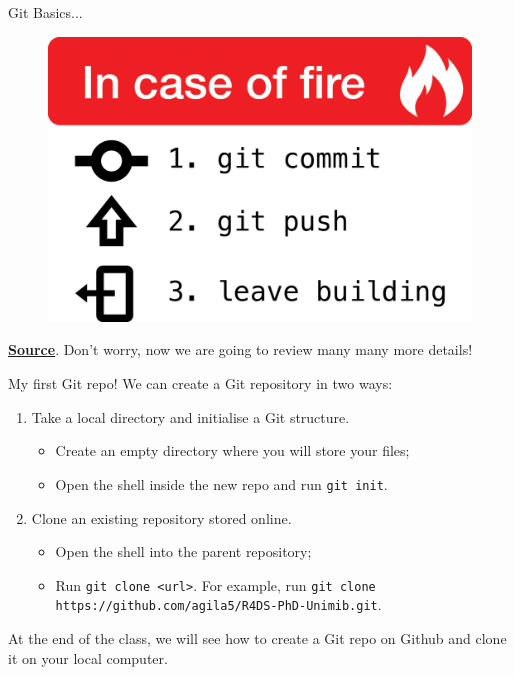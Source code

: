 \documentclass[
hyperref={bookmarks=false},
xcolor={dvipsnames,svgnames*,x11names*}, 
12pt
]{beamer}
\begin{document}
\begin{frame}{Git Basics...}
\vspace{-0.5cm}
\begin{figure}
\centering
\includegraphics[width=0.85\linewidth]{figures/incaseoffire.pdf}
\end{figure}
\href{https://hikaruzone.wordpress.com/2015/10/06/in-case-of-fire-1-git-commit-2-git-push-3-leave-building/}{\textbf{Source}}. Don't worry, now we are going to review many many more details! 
\end{frame}

\setlength{\leftmarginii}{0.25cm}

\begin{frame}{My first Git repo!}
\vspace{-0.5cm}
We can create a Git repository in two ways: 
\begin{enumerate}
\itemsep 2ex	
\item Take a local directory and initialise a Git structure.
\begin{itemize}
\item Create an empty directory where you will store your files;  
\item Open the shell inside the new repo and run \texttt{git init}. 
\end{itemize}
\item Clone an existing repository stored online. 
\begin{itemize}
\item Open the shell into the parent repository; 
\item Run \texttt{git clone <url>}. For example, run \texttt{git clone https://github.com/agila5/R4DS-PhD-Unimib.git}. 
\end{itemize}
\end{enumerate}
At the end of the class, we will see how to create a Git repo on Github and clone it on your local computer. 
\end{frame}
\end{document}

